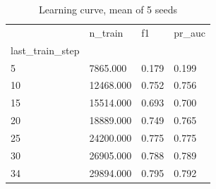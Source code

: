 \begin{table}
\caption{Learning curve, mean of 5 seeds}
\label{tab:02_learning_curve}
\begin{tabular}{llll}
\toprule
 & n\_train & f1 & pr\_auc \\
last\_train\_step &  &  &  \\
\midrule
5 & 7865.000 & 0.179 & 0.199 \\
10 & 12468.000 & 0.752 & 0.756 \\
15 & 15514.000 & 0.693 & 0.700 \\
20 & 18889.000 & 0.749 & 0.765 \\
25 & 24200.000 & 0.775 & 0.775 \\
30 & 26905.000 & 0.788 & 0.789 \\
34 & 29894.000 & 0.795 & 0.792 \\
\bottomrule
\end{tabular}
\end{table}

